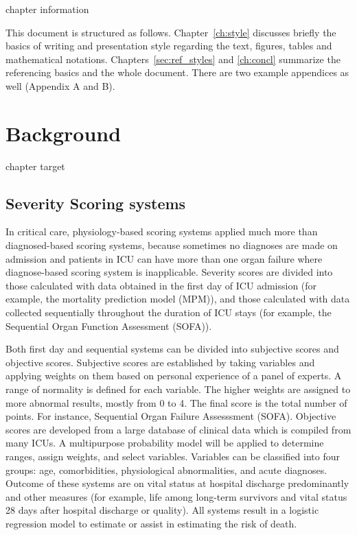 \documentclass[12pt,a4paper,english
]{tunithesis}
\begin{document}
chapter information

This document is structured as follows. Chapter~\ref{ch:style}
discusses briefly the basics of writing and presentation style
regarding the text, figures, tables and mathematical
notations. Chapters~\ref{sec:ref_styles} and \ref{ch:concl} summarize
the referencing basics and the whole document. There are two example
appendices as well (Appendix A and B).

\chapter{Background}
\label{ch:background}

chapter target
\section{Severity Scoring systems}
In critical care, physiology-based scoring systems applied much more than diagnosed-based scoring systems, because sometimes no diagnoses are made on admission and patients in ICU can have more than one organ failure where diagnose-based scoring system is inapplicable. \parencite{Bouch2008} Severity scores are divided into those calculated with data obtained in the first day of ICU admission (for example, the mortality prediction model (MPM)), and those calculated with data collected sequentially throughout the duration of ICU stays (for example, the Sequential Organ Function Assessment (SOFA)). 

Both first day and sequential systems can be divided into subjective scores and objective scores. Subjective scores are established by taking variables and applying weights on them based on personal experience of a panel of experts. A range of normality is defined for each variable. The higher weights are assigned to more abnormal results, mostly from 0 to 4. The final score is the total number of points. For instance, Sequential Organ Failure Assesssment (SOFA). Objective scores are developed from a large database of clinical data which is compiled from many ICUs. A multipurpose probability model will be applied to determine ranges, assign weights, and select variables. Variables can be classified into four groups: age, comorbidities, physiological abnormalities, and acute diagnoses. Outcome of these systems are on vital status at hospital discharge predominantly and other measures (for example, life among long-term survivors and vital status 28 days after hospital discharge or quality). All systems result in a logistic regression model to estimate or assist in estimating the risk of death. \parencite{LeGall2005, Bouch2008} 
\end{document}
